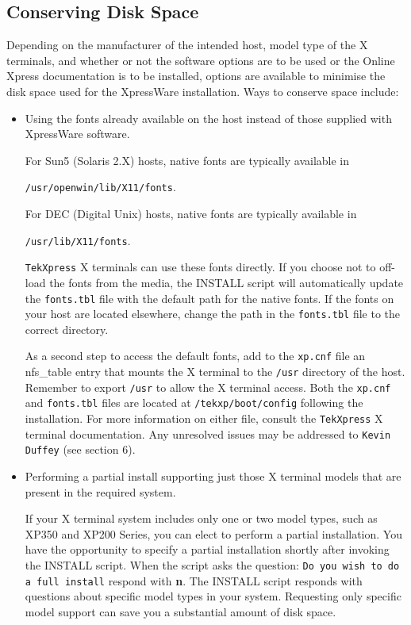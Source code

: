 \documentclass[11pt]{article}
\begin{document}
\subsection {Conserving Disk Space}

Depending on the manufacturer of the intended host, model type of the X
terminals, and whether or not the software options are to be used or the Online
Xpress documentation is to be installed, options are available to minimise the
disk space used for the XpressWare installation. Ways to conserve space
include:

\begin {itemize}

\item Using the fonts already available on the host instead of those supplied
with XpressWare software.

For Sun5 (Solaris 2.X) hosts, native fonts are typically available in

{\tt /usr/openwin/lib/X11/fonts}.

For DEC (Digital Unix) hosts, native fonts are typically available in

{\tt /usr/lib/X11/fonts}.

{\tt TekXpress} X terminals can use these fonts directly. If you choose not to
off-load the fonts from the media, the INSTALL script will automatically update
the {\tt fonts.tbl} file with the default path for the native fonts. If the
fonts on your host are located elsewhere, change the path in the {\tt fonts.tbl}
file to the correct directory.

As a second step to access the default fonts, add to the {\tt xp.cnf} file an
nfs\_table entry that mounts the X terminal to the {\tt /usr} directory of the
host. Remember to export {\tt /usr} to allow the X terminal access. Both the
{\tt xp.cnf} and {\tt fonts.tbl} files are located at {\tt /tekxp/boot/config}
following the installation. For more information on either file, consult the
{\tt TekXpress} X terminal documentation. Any unresolved issues may be addressed
to {\tt Kevin Duffey} (see section 6).

\item Performing a partial install supporting just those X terminal models that
are present in the required system.

If your X terminal system includes only one or two model types, such as XP350
and XP200 Series, you can elect to perform a partial installation. You have the
opportunity to specify a partial installation shortly after invoking the INSTALL
script. When the script asks the question: {\tt Do you wish to do a full install}
respond with {\bf n}. The INSTALL script responds with questions about specific
model types in your system. Requesting only specific model support can save you
a substantial amount of disk space.


\end{itemize}
\end{document}
